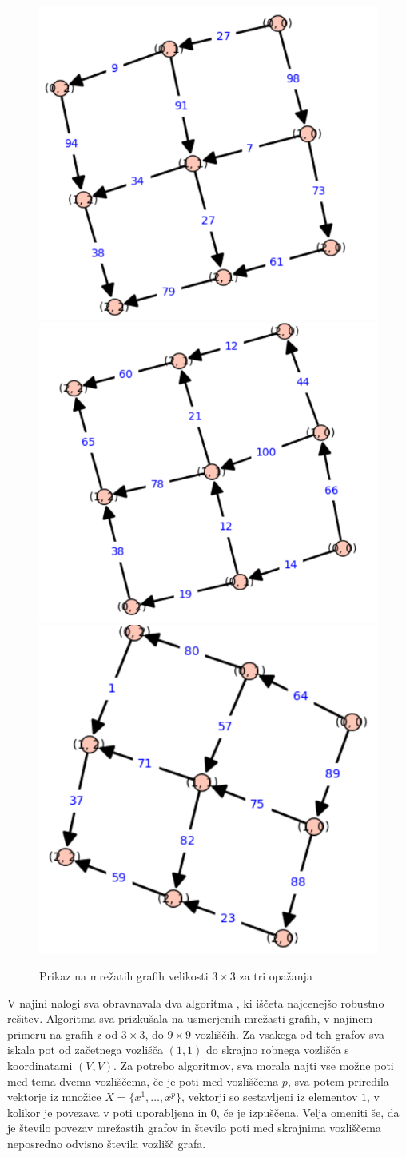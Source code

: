 \documentclass[a4paper, 12 pt]{article}
\theoremstyle{definition} %
\theoremstyle{plain} %
\theoremstyle{definition}
\begin{document}
\begin{figure}[H]
    \includegraphics[width=.5\textwidth]{prvi.png}\hfill
    \includegraphics[width=.5\textwidth]{drugi.png}\hfill
    \includegraphics[width=.5\textwidth]{tretji.png}\hfill
    \\[\smallskipamount]
    \caption{Prikaz na mrežatih grafih velikosti $3 \times 3$ za tri opažanja}\label{fig:foobar}
\end{figure}

  
V najini nalogi sva obravnavala dva algoritma , ki iščeta najcenejšo robustno rešitev. Algoritma sva prizkušala na usmerjenih mrežasti grafih, v najinem primeru na grafih  z od $3\times3$, do $9\times9$ vozliščih. Za vsakega od teh grafov sva iskala pot od začetnega vozlišča $(1, 1)$ do skrajno robnega vozlišča s koordinatami $(V, V)$. Za potrebo algoritmov, sva morala najti vse možne poti med tema dvema vozliščema, če je poti med vozliščema $p$, sva potem priredila vektorje iz množice $X = \{x^1, \dots, x^p \}$, vektorji so sestavljeni iz elementov $1$, v kolikor je povezava v poti uporabljena in $0$, če je izpuščena. Velja omeniti še, da je število povezav mrežastih grafov in število poti med skrajnima vozliščema neposredno odvisno števila vozlišč grafa.\newline
\end{document}
